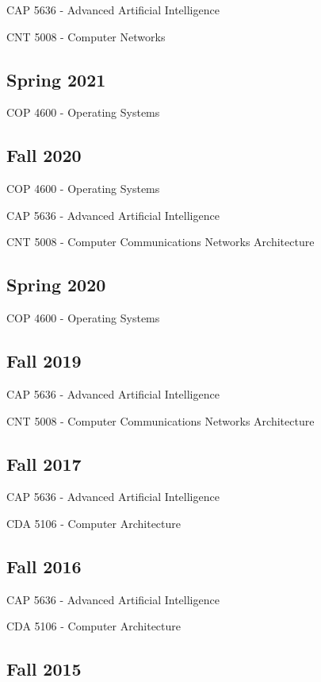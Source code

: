 CAP 5636 - Advanced Artificial Intelligence

CNT 5008 - Computer Networks

\subsection*{Spring 2021}

COP 4600 - Operating Systems

\subsection*{Fall 2020}

COP 4600 - Operating Systems

CAP 5636 - Advanced Artificial Intelligence

CNT 5008 - Computer Communications Networks Architecture


\subsection*{Spring 2020}

COP 4600 - Operating Systems


\subsection*{Fall 2019}

CAP 5636 - Advanced Artificial Intelligence

CNT 5008 - Computer Communications Networks Architecture


\subsection*{Fall 2017}

CAP 5636 - Advanced Artificial Intelligence

CDA 5106 - Computer Architecture

\subsection*{Fall 2016}

CAP 5636 - Advanced Artificial Intelligence

CDA 5106 - Computer Architecture

\subsection*{Fall 2015}

